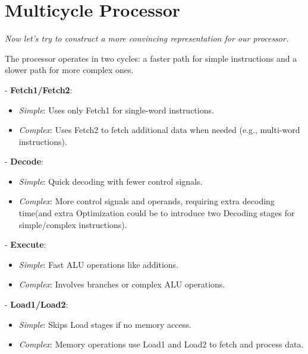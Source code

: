 \section{Multicycle Processor}
\textit{Now let's try to construct a more convincing representation for our processor.}

The processor operates in two cycles: a faster path for simple instructions and a slower path for more complex ones. \\
\begin{minipage}[htp]{0.45\textwidth}
\vspace*{5px}
\footnotesize
\begin{justify}
        - \textbf{Fetch1/Fetch2}: 
        \begin{itemize}
        \item[] \textit{Simple}: Uses only Fetch1 for single-word instructions.
        \item[] \textit{Complex}: Uses Fetch2 to fetch additional data when needed (e.g., multi-word instructions).
        \end{itemize}
    
        - \textbf{Decode}: 
        \begin{itemize}
        \item[] \textit{Simple}: Quick decoding with fewer control signals.
        \item[] \textit{Complex}: More control signals and operands, requiring extra decoding time(and extra Optimization could be to introduce two Decoding stages for simple/complex instructions).
        \end{itemize}
    
        - \textbf{Execute}: 
        \begin{itemize}
        \item[] \textit{Simple}: Fast ALU operations like additions.
        \item[] \textit{Complex}: Involves branches or complex ALU operations.
        \end{itemize}
    
        - \textbf{Load1/Load2}: 
        \begin{itemize}
        \item[] \textit{Simple}: Skips Load stages if no memory access.
        \item[] \textit{Complex}: Memory operations use Load1 and Load2 to fetch and process data.
        \end{itemize}
\end{justify}
\end{minipage}

